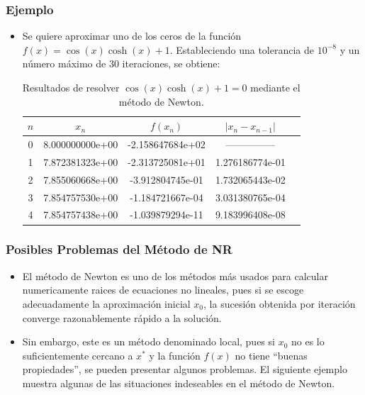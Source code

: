 \documentclass{beamer}
\begin{document}
\begin{frame}
  \frametitle{Ejemplo}
  \begin{itemize}
    \item<1-> Se quiere aproximar uno de los ceros de la funci\'on $f(x) = \cos(x)\cosh(x) + 1$.
    Estableciendo una tolerancia de $10^{-8}$ y un n\'umero m\'aximo de 30 iteraciones, se obtiene:    
    \begin{table}[!ht]
    \begin{center}
      \small{
      \begin{tabular}{|c||c||c||c||c|}\hline
      $n$  & $x_n$ & $f(x_n)$ & $|x_n-x_{n-1}|$ \\\hline\hline
      0 & 8.000000000e+00 & -2.158647684e+02 & --------------- \\\hline
      1 & 7.872381323e+00 & -2.313725081e+01 & 1.276186774e-01 \\\hline
      2 & 7.855060668e+00 & -3.912804745e-01 & 1.732065443e-02 \\\hline
      3 & 7.854757530e+00 & -1.184721667e-04 & 3.031380765e-04 \\\hline
      4 & 7.854757438e+00 & -1.039879294e-11 & 9.183996408e-08  \\\hline  
    \end{tabular}}
     \caption{Resultados de resolver $\cos(x)\cosh(x) + 1=0$ mediante el m\'etodo de Newton.}
     \end{center}
     \label{tab_NR}
    \end{table}
  \end{itemize}
\end{frame}
\begin{frame}
  \frametitle{Posibles Problemas del M\'etodo de NR}
  \begin{itemize}
    \item<1-> El m\'etodo de Newton es uno de los m\'etodos m\'as usados para calcular numericamente raices de ecuaciones no
    lineales, pues si se escoge adecuadamente la aproximaci\'on inicial $x_0$, la sucesi\'on obtenida por iteraci\'on
    converge razonablemente r\'apido a la soluci\'on. 
    \item<2-> Sin embargo, este es un m\'etodo denominado local, pues si $x_0$ no es
    lo suficientemente cercano a $x^*$ y la funci\'on $f(x)$ no tiene ``buenas propiedades'', se pueden presentar algunos
    problemas. El siguiente ejemplo muestra algunas de las situaciones indeseables en el m\'etodo de Newton.    
  \end{itemize}
\end{frame}
\end{document}
